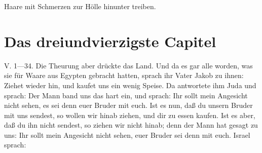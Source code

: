 Haare mit Schmerzen zur Hölle hinunter treiben.

\section{Das dreiundvierzigste Capitel}

V. 1—34. Die Theurung aber drückte das Land. Und da es gar alle worden, was sie für Waare aus Egypten gebracht hatten, sprach ihr Vater Jakob zu ihnen: Ziehet wieder hin, und kaufet uns ein wenig Speise. Da antwortete ihm Juda und sprach: Der Mann band uns das hart ein, und sprach: Ihr sollt mein Angesicht nicht sehen, es sei denn euer Bruder mit euch. Ist es nun, daß du unsern Bruder mit uns sendest, so wollen wir hinab ziehen, und dir zu essen kaufen. Ist es aber, daß du ihn nicht sendest, so ziehen wir nicht hinab; denn der Mann hat gesagt zu uns: Ihr sollt mein Angesicht nicht sehen, euer Bruder sei denn mit euch. Israel sprach:
